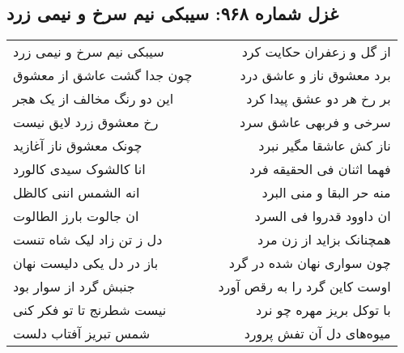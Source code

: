 \begin{center}
\section*{غزل شماره ۹۶۸: سیبکی نیم سرخ و نیمی زرد}
\label{sec:0968}
\begin{longtable}{l p{0.5cm} r}
سیبکی نیم سرخ و نیمی زرد
&&
از گل و زعفران حکایت کرد
\\
چون جدا گشت عاشق از معشوق
&&
برد معشوق ناز و عاشق درد
\\
این دو رنگ مخالف از یک هجر
&&
بر رخ هر دو عشق پیدا کرد
\\
رخ معشوق زرد لایق نیست
&&
سرخی و فربهی عاشق سرد
\\
چونک معشوق ناز آغازید
&&
ناز کش عاشقا مگیر نبرد
\\
انا کالشوک سیدی کالورد
&&
فهما اثنان فی الحقیقه فرد
\\
انه الشمس اننی کالظل
&&
منه حر البقا و منی البرد
\\
ان جالوت بارز الطالوت
&&
ان داوود قدروا فی السرد
\\
دل ز تن زاد لیک شاه تنست
&&
همچنانک بزاید از زن مرد
\\
باز در دل یکی دلیست نهان
&&
چون سواری نهان شده در گرد
\\
جنبش گرد از سوار بود
&&
اوست کاین گرد را به رقص آورد
\\
نیست شطرنج تا تو فکر کنی
&&
با توکل بریز مهره چو نرد
\\
شمس تبریز آفتاب دلست
&&
میوه‌های دل آن تفش پرورد
\\
\end{longtable}
\end{center}
